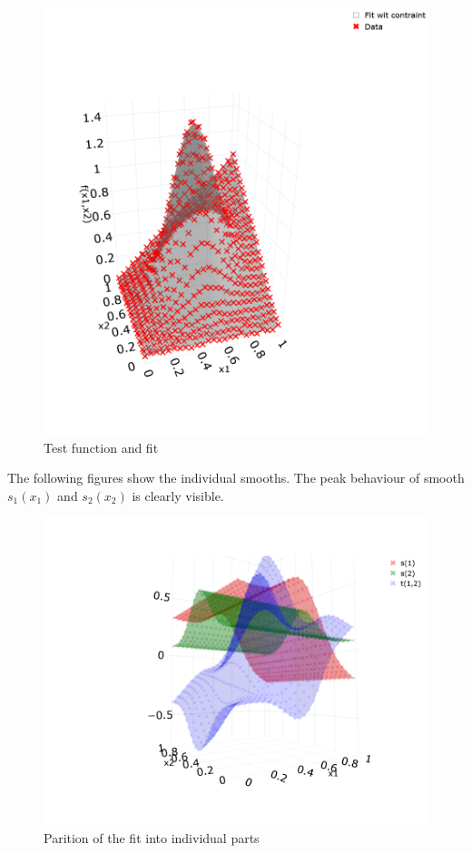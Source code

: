 \documentclass[10pt,a4paper]{article}
\begin{document}
	\begin{figure}[H]
		\centering
		\includegraphics[width=\linewidth]{thesisplots/2d_function.png}
		\caption{Test function and fit}
		\label{fig:2dtestf}
	\end{figure}

	The following figures show the individual smooths. The peak behaviour of smooth $s_1(x_1)$ and $s_2(x_2)$ is clearly visible.

	\begin{figure}[H]
		\centering
		\includegraphics[width=\linewidth]{thesisplots/2d_function_partition.png}
		\caption{Parition of the fit into individual parts}
		\label{fig:2dtestf_parition}
	\end{figure}

	
	
\end{document}
